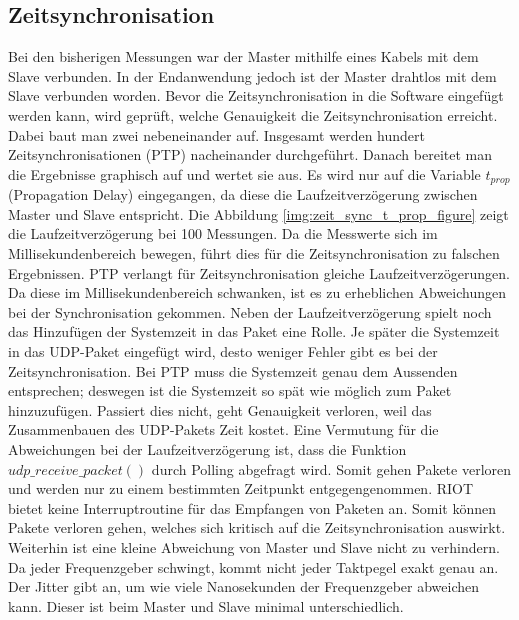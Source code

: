 \subsection{Zeitsynchronisation}
Bei den bisherigen Messungen war der Master mithilfe eines Kabels mit dem Slave verbunden. In der Endanwendung jedoch ist der Master drahtlos mit dem Slave verbunden worden. Bevor die Zeitsynchronisation in die Software eingefügt werden kann, wird geprüft, welche Genauigkeit die Zeitsynchronisation erreicht. Dabei baut man zwei \board \platz nebeneinander auf. Insgesamt werden hundert Zeitsynchronisationen (PTP) nacheinander durchgeführt. Danach bereitet man die Ergebnisse graphisch auf und wertet sie aus. Es wird nur auf die Variable $t_{prop}$ (Propagation Delay) eingegangen, da diese die Laufzeitverzögerung zwischen Master und Slave entspricht. Die Abbildung \ref{img:zeit_sync_t_prop_figure} zeigt die Laufzeitverzögerung bei \si{100} Messungen. Da die Messwerte sich im Millisekundenbereich bewegen, führt dies für die Zeitsynchronisation zu falschen Ergebnissen. PTP verlangt für Zeitsynchronisation gleiche Laufzeitverzögerungen. Da diese im Millisekundenbereich schwanken, ist es zu erheblichen Abweichungen bei der Synchronisation gekommen. Neben der Laufzeitverzögerung spielt noch das Hinzufügen der Systemzeit in das Paket eine Rolle. Je später die Systemzeit in das UDP-Paket eingefügt wird, desto weniger Fehler gibt es bei der Zeitsynchronisation. Bei PTP muss die Systemzeit genau dem Aussenden entsprechen; deswegen ist die Systemzeit so spät wie möglich zum Paket hinzuzufügen. Passiert dies nicht, geht Genauigkeit verloren, weil das Zusammenbauen des UDP-Pakets Zeit kostet. Eine Vermutung für die Abweichungen bei der Laufzeitverzögerung ist, dass die Funktion $udp\_receive\_packet()$ durch Polling abgefragt wird. Somit gehen Pakete verloren und werden nur zu einem bestimmten Zeitpunkt entgegengenommen. RIOT bietet keine Interruptroutine für das Empfangen von Paketen an. Somit können Pakete verloren gehen, welches sich kritisch auf die Zeitsynchronisation auswirkt. Weiterhin ist eine kleine Abweichung von Master und Slave nicht zu verhindern. Da jeder Frequenzgeber schwingt, kommt nicht jeder Taktpegel exakt genau an. Der Jitter gibt an, um wie viele Nanosekunden der Frequenzgeber abweichen kann. Dieser ist beim Master und Slave minimal unterschiedlich.

